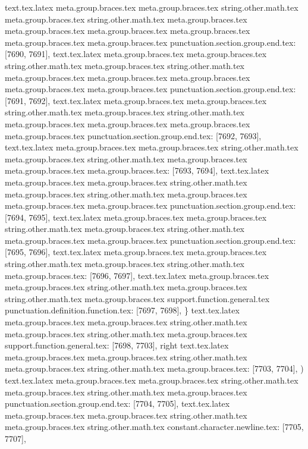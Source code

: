 {{{{{{{{{{{{{{{{{{{{{{{{{{{{{{{{{{{{{{{{{{{{{{{{{{{{{{{{{{{{{{{{{{{{{{{{{{{{{{{{{{{{{{{{{{{{{{{{{{{{{{{{{{{{{{{{{{{{{{{{{{{{{{{{{{{{{{{{{{{{{{{{{{{{{{{{{{{{{{{{{{{{{{{{{{{{{{{{{{{{{{{{{{{{{{{{{{{{{{{{{{{{{{{{{{{{{{{{{{{{{{{{text.tex.latex meta.group.braces.tex meta.group.braces.tex string.other.math.tex meta.group.braces.tex string.other.math.tex meta.group.braces.tex meta.group.braces.tex meta.group.braces.tex meta.group.braces.tex meta.group.braces.tex meta.group.braces.tex punctuation.section.group.end.tex: [7690, 7691], {}}
text.tex.latex meta.group.braces.tex meta.group.braces.tex string.other.math.tex meta.group.braces.tex string.other.math.tex meta.group.braces.tex meta.group.braces.tex meta.group.braces.tex meta.group.braces.tex meta.group.braces.tex punctuation.section.group.end.tex: [7691, 7692], {}}
text.tex.latex meta.group.braces.tex meta.group.braces.tex string.other.math.tex meta.group.braces.tex string.other.math.tex meta.group.braces.tex meta.group.braces.tex meta.group.braces.tex meta.group.braces.tex punctuation.section.group.end.tex: [7692, 7693], {}}
text.tex.latex meta.group.braces.tex meta.group.braces.tex string.other.math.tex meta.group.braces.tex string.other.math.tex meta.group.braces.tex meta.group.braces.tex meta.group.braces.tex: [7693, 7694], { }
text.tex.latex meta.group.braces.tex meta.group.braces.tex string.other.math.tex meta.group.braces.tex string.other.math.tex meta.group.braces.tex meta.group.braces.tex meta.group.braces.tex punctuation.section.group.end.tex: [7694, 7695], {}}
text.tex.latex meta.group.braces.tex meta.group.braces.tex string.other.math.tex meta.group.braces.tex string.other.math.tex meta.group.braces.tex meta.group.braces.tex punctuation.section.group.end.tex: [7695, 7696], {}}
text.tex.latex meta.group.braces.tex meta.group.braces.tex string.other.math.tex meta.group.braces.tex string.other.math.tex meta.group.braces.tex: [7696, 7697], { }
text.tex.latex meta.group.braces.tex meta.group.braces.tex string.other.math.tex meta.group.braces.tex string.other.math.tex meta.group.braces.tex support.function.general.tex punctuation.definition.function.tex: [7697, 7698], {\}
text.tex.latex meta.group.braces.tex meta.group.braces.tex string.other.math.tex meta.group.braces.tex string.other.math.tex meta.group.braces.tex support.function.general.tex: [7698, 7703], {right}
text.tex.latex meta.group.braces.tex meta.group.braces.tex string.other.math.tex meta.group.braces.tex string.other.math.tex meta.group.braces.tex: [7703, 7704], {)}
text.tex.latex meta.group.braces.tex meta.group.braces.tex string.other.math.tex meta.group.braces.tex string.other.math.tex meta.group.braces.tex punctuation.section.group.end.tex: [7704, 7705], {}}
text.tex.latex meta.group.braces.tex meta.group.braces.tex string.other.math.tex meta.group.braces.tex string.other.math.tex constant.character.newline.tex: [7705, 7707], {\\}
}}}}}}}}}}}}}}}}}}}}}}}}}}}}}}}}}}}}}}}}}}}}}}}}}}}}}}}}}}}}}}}}}}}}}}}}}}}}}}}}}}}}}}}}}}}}}}}}}}}}}}}}}}}}}}}}}}}}}}}}}}}}}}}}}}}}}}}}}}}}}}}}}}}}}}}}}}}}}}}}}}}}}}}}}}}}}}}}}}}}}}}}}}}}}}}}}}}}}}}}}}}}}}}}}}}}}}}}}}}
